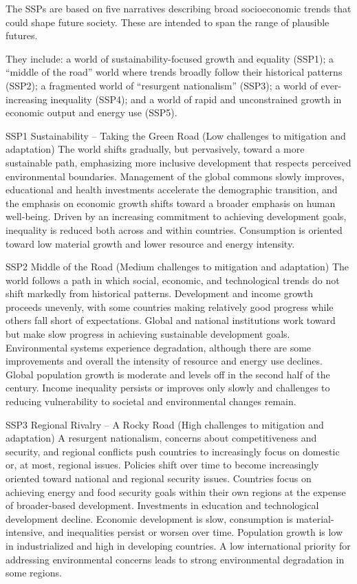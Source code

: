 \documentclass[
]{book}
\begin{document}
The SSPs are based on five narratives describing broad socioeconomic trends that could shape future society. These are intended to span the range of plausible futures.

They include: a world of sustainability-focused growth and equality (SSP1); a ``middle of the road'' world where trends broadly follow their historical patterns (SSP2); a fragmented world of ``resurgent nationalism'' (SSP3); a world of ever-increasing inequality (SSP4); and a world of rapid and unconstrained growth in economic output and energy use (SSP5).

SSP1 Sustainability -- Taking the Green Road (Low challenges to mitigation and adaptation)
The world shifts gradually, but pervasively, toward a more sustainable path, emphasizing more inclusive development that respects perceived environmental boundaries. Management of the global commons slowly improves, educational and health investments accelerate the demographic transition, and the emphasis on economic growth shifts toward a broader emphasis on human well-being. Driven by an increasing commitment to achieving development goals, inequality is reduced both across and within countries. Consumption is oriented toward low material growth and lower resource and energy intensity.

SSP2 Middle of the Road (Medium challenges to mitigation and adaptation)
The world follows a path in which social, economic, and technological trends do not shift markedly from historical patterns. Development and income growth proceeds unevenly, with some countries making relatively good progress while others fall short of expectations. Global and national institutions work toward but make slow progress in achieving sustainable development goals. Environmental systems experience degradation, although there are some improvements and overall the intensity of resource and energy use declines. Global population growth is moderate and levels off in the second half of the century. Income inequality persists or improves only slowly and challenges to reducing vulnerability to societal and environmental changes remain.

SSP3 Regional Rivalry -- A Rocky Road (High challenges to mitigation and adaptation)
A resurgent nationalism, concerns about competitiveness and security, and regional conflicts push countries to increasingly focus on domestic or, at most, regional issues. Policies shift over time to become increasingly oriented toward national and regional security issues. Countries focus on achieving energy and food security goals within their own regions at the expense of broader-based development. Investments in education and technological development decline. Economic development is slow, consumption is material-intensive, and inequalities persist or worsen over time. Population growth is low in industrialized and high in developing countries. A low international priority for addressing environmental concerns leads to strong environmental degradation in some regions.
\end{document}
